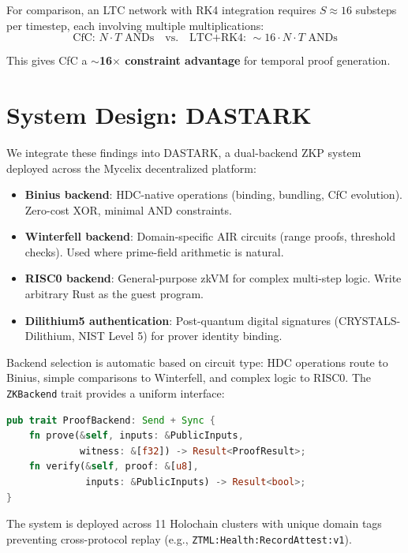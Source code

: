 \documentclass[11pt,twocolumn]{article}
\begin{document}
For comparison, an LTC network with RK4 integration requires $S \approx 16$ substeps per timestep, each involving multiple multiplications:
$$\text{CfC: } N \cdot T \text{ ANDs} \quad \text{vs.} \quad \text{LTC+RK4: } \sim 16 \cdot N \cdot T \text{ ANDs}$$

This gives CfC a \textbf{$\sim$16$\times$ constraint advantage} for temporal proof generation.

\section{System Design: DASTARK}
\label{sec:system}

We integrate these findings into DASTARK, a dual-backend ZKP system deployed across the Mycelix decentralized platform:

\begin{itemize}
    \item \textbf{Binius backend}: HDC-native operations (binding, bundling, CfC evolution). Zero-cost XOR, minimal AND constraints.
    \item \textbf{Winterfell backend}: Domain-specific AIR circuits (range proofs, threshold checks). Used where prime-field arithmetic is natural.
    \item \textbf{RISC0 backend}: General-purpose zkVM for complex multi-step logic. Write arbitrary Rust as the guest program.
    \item \textbf{Dilithium5 authentication}: Post-quantum digital signatures (CRYSTALS-Dilithium, NIST Level 5) for prover identity binding.
\end{itemize}

Backend selection is automatic based on circuit type: HDC operations route to Binius, simple comparisons to Winterfell, and complex logic to RISC0. The \texttt{ZKBackend} trait provides a uniform interface:

\begin{lstlisting}[language=Rust,basicstyle=\small\ttfamily]
pub trait ProofBackend: Send + Sync {
    fn prove(&self, inputs: &PublicInputs,
             witness: &[f32]) -> Result<ProofResult>;
    fn verify(&self, proof: &[u8],
              inputs: &PublicInputs) -> Result<bool>;
}
\end{lstlisting}

The system is deployed across 11 Holochain clusters with unique domain tags preventing cross-protocol replay (e.g., \texttt{ZTML:Health:RecordAttest:v1}).
\end{document}
